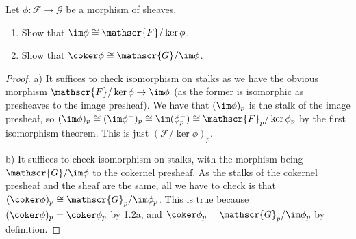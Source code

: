 \begin{exercise}%
	Let $\phi :\mathscr{F}\to \mathscr{G} $ be a morphism of sheaves.
	\begin{enumerate}
		\item Show that $\im \phi \cong \mathscr{F} / \ker \phi $.
		\item Show that $\coker \phi \cong \mathscr{G} / \im \phi $.
	\end{enumerate}
\end{exercise}
\begin{proof}
	a) It suffices to check isomorphism on stalks as we have the obvious morphism $\mathscr{F} / \ker \phi \to \im \phi$ (as the former is isomorphic as presheaves to the image presheaf).
	We have that $(\im \phi)_p $ is the stalk of the image presheaf, so $(\im \phi)_p \cong (\im \phi^-)_p \cong \im (\phi^-_p) \cong \mathscr{F}_p / \ker \phi_p$ by the first isomorphism theorem.
	This is just $(\mathscr{F} / \ker \phi)_p$.

	b) It suffices to check isomorphism on stalks, with the morphism being $\mathscr{G} / \im \phi $ to the cokernel presheaf.
	As the stalks of the cokernel presheaf and the sheaf are the same, all we have to check is that $(\coker \phi)_p \cong \mathscr{G}_p / \im \phi_p $.
	This is true because $(\coker \phi)_p = \coker \phi_p$ by 1.2a, and $\coker \phi_p = \mathscr{G}_p / \im \phi_p $ by definition.
\end{proof}

